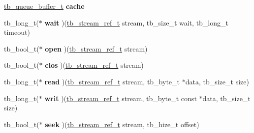 \begin{DoxyCompactItemize}
\item 
\hypertarget{structtb__stream__impl__t_ac071d2256ccf641517dccf6d6ba3412f}{\hyperlink{structtb__queue__buffer__t}{tb\-\_\-queue\-\_\-buffer\-\_\-t} {\bfseries cache}}\label{structtb__stream__impl__t_ac071d2256ccf641517dccf6d6ba3412f}

\item 
\hypertarget{structtb__stream__impl__t_a7447f21ddb684eb2e3c30e92202b7e87}{tb\-\_\-long\-\_\-t($\ast$ {\bfseries wait} )(\hyperlink{structtb__stream__ref__t}{tb\-\_\-stream\-\_\-ref\-\_\-t} stream, tb\-\_\-size\-\_\-t wait, tb\-\_\-long\-\_\-t timeout)}\label{structtb__stream__impl__t_a7447f21ddb684eb2e3c30e92202b7e87}

\item 
\hypertarget{structtb__stream__impl__t_add6b48f77d34f515ea8ff70b9db0d76a}{tb\-\_\-bool\-\_\-t($\ast$ {\bfseries open} )(\hyperlink{structtb__stream__ref__t}{tb\-\_\-stream\-\_\-ref\-\_\-t} stream)}\label{structtb__stream__impl__t_add6b48f77d34f515ea8ff70b9db0d76a}

\item 
\hypertarget{structtb__stream__impl__t_a067be8730dec9175894367ba7b1eba0e}{tb\-\_\-bool\-\_\-t($\ast$ {\bfseries clos} )(\hyperlink{structtb__stream__ref__t}{tb\-\_\-stream\-\_\-ref\-\_\-t} stream)}\label{structtb__stream__impl__t_a067be8730dec9175894367ba7b1eba0e}

\item 
\hypertarget{structtb__stream__impl__t_acb55fb638edee5d67d7235a3b3212dab}{tb\-\_\-long\-\_\-t($\ast$ {\bfseries read} )(\hyperlink{structtb__stream__ref__t}{tb\-\_\-stream\-\_\-ref\-\_\-t} stream, tb\-\_\-byte\-\_\-t $\ast$data, tb\-\_\-size\-\_\-t size)}\label{structtb__stream__impl__t_acb55fb638edee5d67d7235a3b3212dab}

\item 
\hypertarget{structtb__stream__impl__t_a432bf94e3020b5b5f010b55776dea680}{tb\-\_\-long\-\_\-t($\ast$ {\bfseries writ} )(\hyperlink{structtb__stream__ref__t}{tb\-\_\-stream\-\_\-ref\-\_\-t} stream, tb\-\_\-byte\-\_\-t const $\ast$data, tb\-\_\-size\-\_\-t size)}\label{structtb__stream__impl__t_a432bf94e3020b5b5f010b55776dea680}

\item 
\hypertarget{structtb__stream__impl__t_afeb07492e028200e88ae98670b19ee9e}{tb\-\_\-bool\-\_\-t($\ast$ {\bfseries seek} )(\hyperlink{structtb__stream__ref__t}{tb\-\_\-stream\-\_\-ref\-\_\-t} stream, tb\-\_\-hize\-\_\-t offset)}\label{structtb__stream__impl__t_afeb07492e028200e88ae98670b19ee9e}


\end{DoxyCompactItemize}
